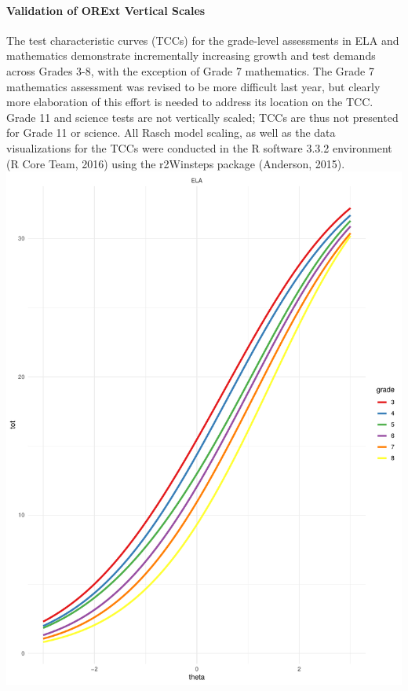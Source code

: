 \documentclass[]{article}
\let\oldparagraph\paragraph
\renewcommand{\paragraph}[1]{\oldparagraph{#1}\mbox{}}
\begin{document}
\hypertarget{validation-of-orext-vertical-scales}{%
\paragraph{Validation of ORExt Vertical
Scales}\label{validation-of-orext-vertical-scales}}

The test characteristic curves (TCCs) for the grade-level assessments in
ELA and mathematics demonstrate incrementally increasing growth and test
demands across Grades 3-8, with the exception of Grade 7 mathematics.
The Grade 7 mathematics assessment was revised to be more difficult last
year, but clearly more elaboration of this effort is needed to address
its location on the TCC. Grade 11 and science tests are not vertically
scaled; TCCs are thus not presented for Grade 11 or science. All Rasch
model scaling, as well as the data visualizations for the TCCs were
conducted in the R software 3.3.2 environment (R Core Team, 2016) using
the r2Winsteps package (Anderson, 2015). \FloatBarrier
\includegraphics{tccs/019ELA_TCC.pdf}
\end{document}
